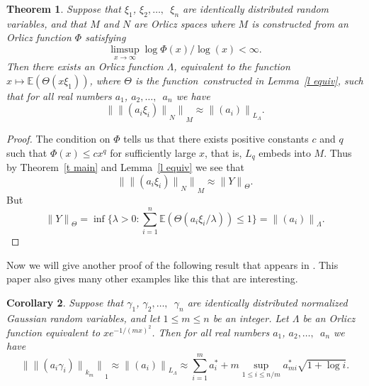\documentclass[12pt]{amsart}
\newtheorem{thm}{Theorem}
\newtheorem{cor}[thm]{Corollary}
\newcommand{\E}{{\mathbb E}}
\newcommand{\snormo}[1]{{\mathopen\|#1\mathclose\|}}
\begin{document}
\begin{thm}
\label{t orlicz}
Suppose that $\xi_1$, 
$\xi_2,\dots,$\ $\xi_n$ are identically distributed random variables,
and that $M$ and $N$ are Orlicz spaces where 
$M$ is constructed from an Orlicz function
$\Phi$ satisfying 
\[
   \limsup_{x\to\infty} \log \Phi(x)/\log(x) < \infty .
\]
Then there exists an Orlicz
function $\Lambda$, equivalent to the function
$x\mapsto \E(\Theta(x \xi_1))$, where $\Theta$ is the function\
constructed in Lemma~\ref{l equiv}, such that for all real numbers
$a_1$, $a_2,\dots,$\ $a_n$ we have
\[
   \snormo{\snormo{(a_i \xi_i)}_N}_M \approx \snormo{(a_i)}_{L_\Lambda} .
\]
\end{thm}

\begin{proof}
The condition on $\Phi$ tells us that there exists positive constants 
$c$ and $q$ such
that
$\Phi(x) \le c x^q$ for sufficiently large $x$, that is,
$L_q$ embeds into $M$.
Thus by Theorem~\ref{t main} and Lemma~\ref{l equiv} we see that
\[
   \snormo{\snormo{(a_i \xi_i)}_N}_M \approx
   \snormo Y_\Theta .
\]
But 
\[
   \snormo Y_\Theta 
   =
   \inf\{\lambda>0 \colon \sum_{i=1}^n \E(\Theta(a_i \xi_i/\lambda)) \le 1\}
   =
   \snormo{(a_i)}_\Lambda .
\]
\end{proof}

Now we will give another proof of the following result that appears in 
\cite{gordon et al}.  
This paper also gives many other examples like this
that are interesting.

\begin{cor}
Suppose that $\gamma_1$, 
$\gamma_2,\dots,$\ $\gamma_n$ are identically distributed 
normalized Gaussian
random variables,
and let $1 \le m \le n$ be an integer.
Let $\Lambda$ be an Orlicz function equivalent to $x e^{-1/(mx)^2}$.
Then for all real numbers
$a_1$, $a_2,\dots,$\ $a_n$ we have
\begin{equation}
\label{e Gauss}
   \snormo{\snormo{(a_i \gamma_i)}_{k_m}}_1 \approx \snormo{(a_i)}_{L_\Lambda} 
   \approx \sum_{i=1}^m a^*_i 
   + m \sup_{1 \le i \le n/m} a^*_{m i} \sqrt{1+\log i} .
\end{equation}
\end{cor}
\end{document}
